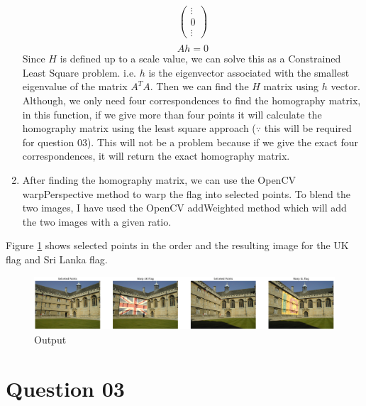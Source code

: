 \documentclass[a4paper]{article}
\begin{document}
\begin{enumerate}
\begin{align*}
     \begin{pmatrix}
       \vdots \\ 0 \\ \vdots
     \end{pmatrix}\\
   \end{align*}
   $$Ah=0$$
   Since $H$ is defined up to a scale value, we can solve
    this as a Constrained Least
     Square problem. i.e. $h$ is 
     the eigenvector associated with the smallest eigenvalue
      of the matrix $A^TA$. Then we can find the $H$ matrix using $h$ vector.
      Although, we only need four correspondences to find the
   homography matrix, in this function, if we give more than four
    points it will calculate the homography matrix using the least
     square approach  ($\because$ this will be required for question 03). This
      will not be a problem because if we give the exact four
       correspondences, it will return the exact homography matrix.
    \item After finding the homography matrix, we can use the
     OpenCV warpPerspective
      method to warp the flag into selected points.
       To blend the two images, I have used the OpenCV
        addWeighted method which will add the two images with
         a given ratio.
    \end{enumerate}
Figure \ref{q2} shows selected points in the order and the resulting
     image for the UK flag and Sri Lanka flag.


\begin{figure}[!htb]
  \centering
  \includegraphics[width=\textwidth]{images/q22.png}
  \caption{Output}
  \label{q2}
\end{figure}


\section*{Question 03}
\end{document}
